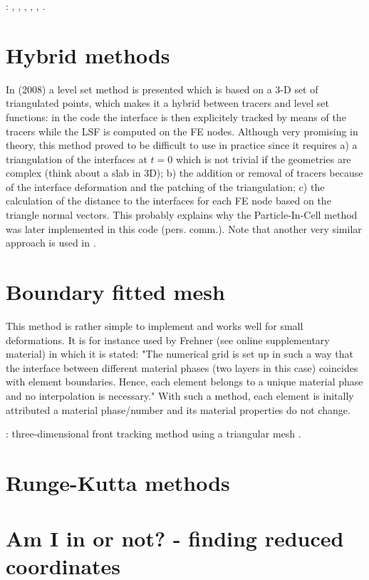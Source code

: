 \Literature: 
\textcite{zhha03},
\textcite{liva05},
\textcite{liva06a},
\textcite{liva06b},
\textcite{kaus05},
\textcite{mulyukova}.

\section{Hybrid methods}

In \textcite{brtf08} (2008) a level set method is presented which is based on a 3-D set
of triangulated points, which makes it a hybrid between tracers and level set functions:
in the \douar code the interface is then explicitely tracked by means of the tracers while the LSF is computed 
on the FE nodes. Although very promising in theory, this method proved to be difficult to use in practice
since it requires a) a triangulation of the interfaces at $t=0$ which is not trivial if the geometries
are complex (think about a slab in 3D); b) the addition or removal of tracers because of the interface deformation
and the patching of the triangulation; c) the calculation of the distance to the interfaces for each 
FE node based on the triangle normal vectors. 
This probably explains why the Particle-In-Cell method was later implemented in this code (pers. comm.).
Note that another very similar approach is used in \cite{saev10}.

\section{Boundary fitted mesh}

This method is rather simple to implement and works well for small deformations. It is 
for instance used by Frehner \cite{freh14} (see online supplementary material) in which it is 
stated: "The numerical grid is set up in such a way that the interface
between different material phases (two layers in this case) coincides with element boundaries. Hence, each
element belongs to a unique material phase and no interpolation is necessary."
With such a method, each element is initally attributed a material phase/number and its material
properties do not change. 


\vspace{2cm} 

\Literature: three-dimensional front tracking method using a triangular mesh \cite{sclo03}.

\section{Runge-Kutta methods \label{ss:rkm}}
 

\section{Am I in or not? - finding reduced coordinates}\label{sec:amiin}
 
